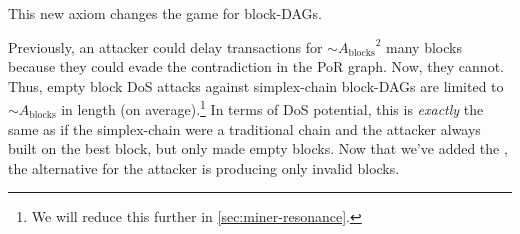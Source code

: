 This new axiom changes the game for block-DAGs.


Previously, an attacker could delay transactions for $\sim {A_\text{blocks}}^2$ many blocks because they could evade the contradiction in the PoR graph.
Now, they cannot.
Thus, empty block DoS attacks against simplex-chain block-DAGs are limited to $\sim A_\text{blocks}$ in length (on average).\footnote{
    We will reduce this further in \autoref{sec:miner-resonance}.
}
In terms of DoS potential, this is \emph{exactly} the same as if the simplex-chain were a traditional chain and the attacker always built on the best block, but only made empty blocks.
Now that we've added the \AxiomOfUnifiedAncestry, the alternative for the attacker is producing only invalid blocks.





